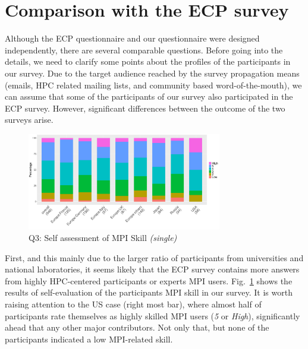 \documentclass[preprint,5p,times]{elsarticle}
\def\myquote#1{{\it #1}}
\def\mcountries{major contributors\xspace{}}%
\begin{document}
\section{Comparison with the ECP survey}\label{sec:ecp}

Although the ECP questionnaire and our questionnaire were designed
independently, there are several comparable questions. Before going into the
details, we need to clarify some points about the profiles of the participants
in our survey.
%
Due to the target audience reached by the survey propagation means (emails, HPC
related mailing lists, and community based word-of-the-mouth), we can assume
that some of the participants of our survey also participated in the ECP survey.
However, significant differences between the outcome of the two surveys arise.

\begin{figure}[htb]
  \begin{center}
    \includegraphics[width=8.5cm]{R-scripts/Q3.pdf}
    \caption{Q3: Self assessment of MPI Skill {\it(single)}}
    \label{fig:mpi-skill}
  \end{center}
\end{figure}

First, and this mainly due to the larger ratio of participants from universities
and national laboratories, it seems likely that the ECP survey contains more
answers from highly HPC-centered participants or experts MPI users.
Fig.~\ref{fig:mpi-skill} shows the results of self-evaluation of the
participants MPI skill in our survey.  It is worth raising attention to the US
case (right most bar), where almost half of participants rate themselves as
highly skilled MPI users (\myquote{5} or \myquote{High}), significantly ahead
that any other \mcountries. Not only that, but none of the participants
indicated a low MPI-related skill.
\end{document}
